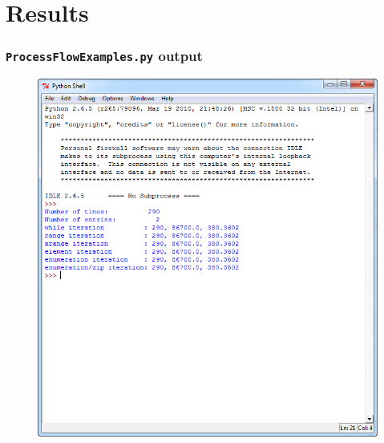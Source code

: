 \documentclass[t]{beamer}
\begin{document}
\section{Results}
\begin{frame}[fragile]
\frametitle{\texttt{ProcessFlowExamples.py} output}
  \begin{figure}[ht]
  \centering
        \includegraphics[height=0.85\textheight]{figures/ProcessFlowExamplesPythonShellOutput}
   \end{figure}
\end{frame}
\end{document}
